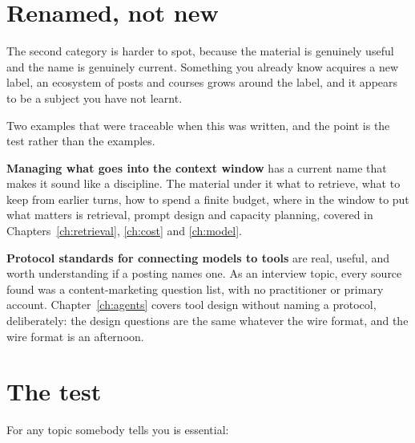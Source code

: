
\section{Renamed, not new}

The second category is harder to spot, because the material is genuinely useful
and the name is genuinely current. Something you already know acquires a new
label, an ecosystem of posts and courses grows around the label, and it appears
to be a subject you have not learnt.

Two examples that were traceable when this was written, and the point is the
test rather than the examples.

\textbf{Managing what goes into the context window} has a current name that
makes it sound like a discipline. The material under it \dash{} what to
retrieve, what to keep from earlier turns, how to spend a finite budget, where
in the window to put what matters \dash{} is retrieval, prompt design and
capacity planning, covered in Chapters~\ref{ch:retrieval}, \ref{ch:cost} and
\ref{ch:model}. 

\textbf{Protocol standards for connecting models to tools} are real, useful,
and worth understanding if a posting names one. As an interview topic, every
source found was a content-marketing question list, with no practitioner or
primary account. Chapter~\ref{ch:agents} covers tool design without naming a
protocol, deliberately: the design questions are the same whatever the wire
format, and the wire format is an afternoon.

\section{The test}

For any topic somebody tells you is essential:

